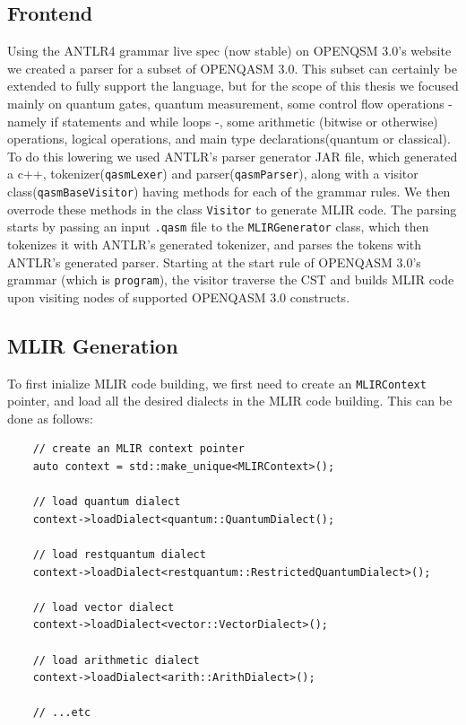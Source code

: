 \subsection{Frontend}
Using the ANTLR4 grammar live spec (now stable) on OPENQSM 3.0's website we
created a parser for a subset of OPENQASM 3.0. This subset can certainly be
extended to fully support the language, but for the scope of this thesis we
focused mainly on quantum gates, quantum measurement, some control flow
operations - namely if statements and while loops -, some arithmetic (bitwise or
otherwise) operations, logical operations, and main type declarations(quantum or
classical). To do this lowering we used ANTLR's parser generator JAR file, which
generated a c++, tokenizer(\texttt{qasmLexer}) and parser(\texttt{qasmParser}),
along with a visitor class(\texttt{qasmBaseVisitor}) having methods for each of
the grammar rules. We then overrode these methods in the class \texttt{Visitor}
to generate MLIR code. The parsing starts by passing an input \texttt{.qasm}
file to the \texttt{MLIRGenerator} class, which then tokenizes it with ANTLR's
generated tokenizer, and parses the tokens with ANTLR's generated parser.
Starting at the start rule of OPENQASM 3.0's grammar (which is
\texttt{program}), the visitor traverse the CST and builds MLIR code upon
visiting nodes of supported OPENQASM 3.0 constructs.
\subsection{MLIR Generation}
To first inialize MLIR code building, we first need to create an
\texttt{MLIRContext} pointer, and load all the desired dialects in the MLIR code
building. This can be done as follows:
\begin{verbatim}
    // create an MLIR context pointer 
    auto context = std::make_unique<MLIRContext>();

    // load quantum dialect 
    context->loadDialect<quantum::QuantumDialect();

    // load restquantum dialect
    context->loadDialect<restquantum::RestrictedQuantumDialect>();
    
    // load vector dialect
    context->loadDialect<vector::VectorDialect>();

    // load arithmetic dialect 
    context->loadDialect<arith::ArithDialect>();

    // ...etc
\end{verbatim}

